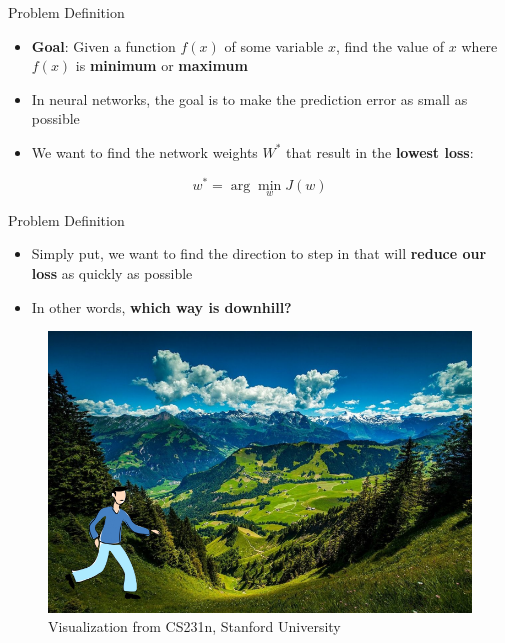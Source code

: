 \documentclass[serif, aspectratio=169]{beamer}
\begin{document}
\begin{frame}{Problem Definition}
    \begin{itemize}%
        \item \textbf{Goal}: Given a function $f(x)$ of some variable $x$, find the value of $x$ where $f(x)$ is \textbf{minimum} or \textbf{maximum}
        \item In neural networks, the goal is to make the prediction error as small as possible
        \item We want to find the network weights $W^*$ that result in the \textbf{lowest loss}:
    \end{itemize}
    
    \[
    w^* = \arg\min_{w} J(w)
    \]


    
\end{frame}
\begin{frame}{Problem Definition}
    \begin{itemize}
        \item Simply put, we want to find the direction to step in that will \textbf{reduce our loss} as quickly as possible
        \item In other words, \textbf{which way is downhill?}
    \end{itemize}
    \begin{figure}[h]
        \centering
        \includegraphics[width=0.5\linewidth]{pic/downhill_feifei_rouhan.png}
        \caption{Visualization from CS231n, Stanford University}
        \label{fig:enter-label}
    \end{figure}
\end{frame}
\end{document}
